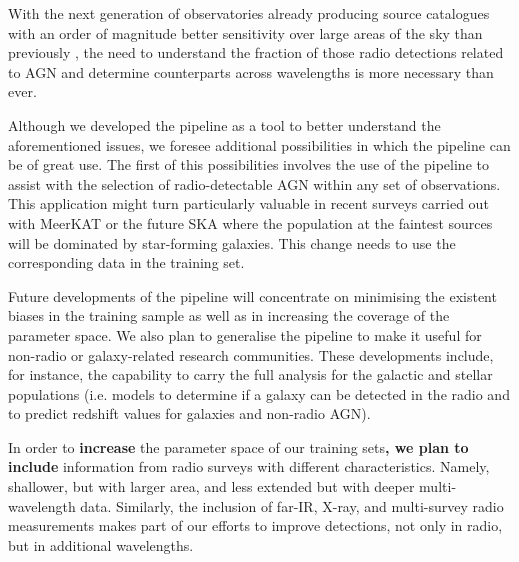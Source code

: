 \documentclass{aa}
\begin{document}

With the next generation of observatories already producing source catalogues with an order of magnitude better sensitivity over large areas of the sky than previously \citep[e.g. RACS, EMU, and MIGHTEE; ][respectively]{2020PASA...37...48M, 2011PASA...28..215N, 2016mks..confE...6J}, the need to understand the fraction of those radio detections related to AGN and determine counterparts across wavelengths is more necessary than ever. %

Although we developed the pipeline as a tool to better understand the aforementioned issues, we foresee additional possibilities in which the pipeline can be of great use. The first of this possibilities involves the use of the pipeline to assist with the selection of radio-detectable AGN within any set of observations. This application might turn particularly valuable in recent surveys carried out with MeerKAT \citep{2016mks..confE...1J} or the future SKA where the population at the faintest sources will be dominated by star-forming galaxies. This change needs to use the corresponding data in the training set.

Future developments of the pipeline will concentrate on minimising the existent biases in the training sample as well as in increasing the coverage of the parameter space. We also plan to generalise the pipeline to make it useful for non-radio or galaxy-related research communities. These developments include, for instance, the capability to carry the full analysis for the galactic and stellar populations (i.e. models to determine if a galaxy can be detected in the radio and to predict redshift values for galaxies and non-radio AGN). %

In order to \textbf{increase} the parameter space of our training sets\textbf{, we plan to include} information from radio surveys with different characteristics. Namely, shallower, but with larger area, and less extended but with deeper multi-wavelength data. Similarly, the inclusion of far-IR, X-ray, and multi-survey radio measurements makes part of our efforts to improve detections, not only in radio, but in additional wavelengths.
\end{document}
